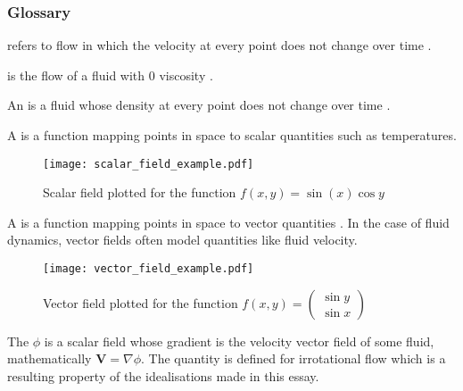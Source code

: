 \subsubsection{Glossary}
\begin{defn} %
     refers to flow in which the velocity at every point does not change over time \cite{CRACIUNOIU2001559}.
\end{defn}
\begin{defn} %
     is the flow of a fluid with 0 viscosity \cite{ANDERSON20031}.
\end{defn}
\begin{defn} %
    An  is a fluid whose density at every point does not change over time \cite{AHMED2019331}.
\end{defn}
\begin{defn} %
	A  is a function mapping points in space to scalar quantities such as temperatures.

	\begin{figure*}[!ht]
		\texttt{[image: scalar\_field\_example.pdf]}
		\centering
		\caption{Scalar field plotted for the function $f(x,y)=\sin(x)\cos y$}
	\end{figure*}
\end{defn}
\begin{defn} %
    A  is a function mapping points in space to vector quantities \cite{BREZINSKI20063}. In
	the case of fluid dynamics, vector fields often model quantities like fluid velocity.

	\begin{figure*}[!ht]
		\texttt{[image: vector\_field\_example.pdf]}
		\centering
		\caption{Vector field plotted for the function $f(x,y)=\begin{pmatrix}
			\sin y\\\sin x
		\end{pmatrix}$}
	\end{figure*}
\end{defn}
\begin{defn} %
	The  $\phi$ is a scalar field whose gradient is the velocity vector field of some
	fluid, mathematically $\mathbf{V}=\nabla\phi$. The quantity is defined for irrotational flow which is a resulting
	property of the idealisations made in this essay.
\end{defn}

